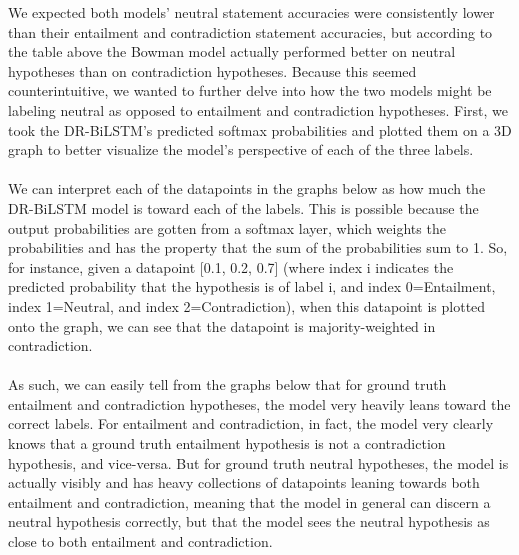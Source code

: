 \documentclass[12pt,letterpaper]{article}
\begin{document}
We expected both models' neutral statement accuracies were consistently lower than their entailment and contradiction statement accuracies, but according to the table above the Bowman model actually performed better on neutral hypotheses than on contradiction hypotheses. Because this seemed counterintuitive, we wanted to further delve into how the two models might be labeling neutral as opposed to entailment and contradiction hypotheses. First, we took the DR-BiLSTM's predicted softmax probabilities and plotted them on a 3D graph to better visualize the model's perspective of each of the three labels.\\ \\
We can interpret each of the datapoints in the graphs below as how much the DR-BiLSTM model is  toward each of the labels. This is possible because the output probabilities are gotten from a softmax layer, which weights the probabilities and has the property that the sum of the probabilities sum to 1. So, for instance, given a datapoint [0.1, 0.2, 0.7] (where index i indicates the predicted probability that the hypothesis is of label i, and index 0=Entailment, index 1=Neutral, and index 2=Contradiction), when this datapoint is plotted onto the graph, we can see that the datapoint is majority-weighted in contradiction. \\ \\ 
As such, we can easily tell from the graphs below that for ground truth entailment and contradiction hypotheses, the model very heavily leans toward the correct labels. For entailment and contradiction, in fact, the model very clearly knows that a ground truth entailment hypothesis is not a contradiction hypothesis, and vice-versa. But for ground truth neutral hypotheses, the model is actually visibly  and has heavy collections of datapoints leaning towards both entailment and contradiction, meaning that the model in general can discern a neutral hypothesis correctly, but that the model sees the neutral hypothesis as close to both entailment and contradiction.
\end{document}
